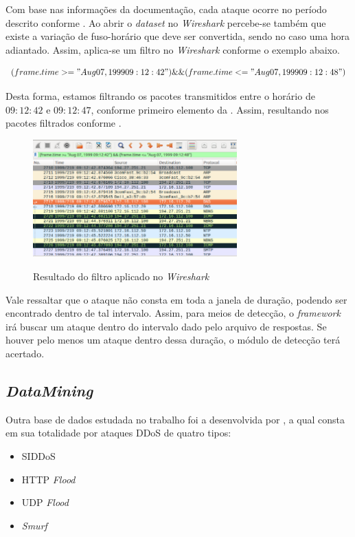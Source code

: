  Com base nas informações da documentação, cada ataque ocorre no período descrito conforme .  Ao abrir o \textit{dataset} no \textit{Wireshark} percebe-se também que existe a variação de fuso-horário que deve ser convertida, sendo no caso uma hora adiantado. Assim, aplica-se um filtro no \textit{Wireshark} conforme o exemplo abaixo.
 
 \begin{equation}
 	(frame.time >= "Aug 07, 1999 09:12:42") \&\& (frame.time <= "Aug 07, 1999 09:12:48")
 \end{equation} 
 
 Desta forma, estamos filtrando os pacotes transmitidos entre o horário de $09:12:42$ e $09:12:47$, conforme primeiro elemento da . Assim, resultando nos pacotes filtrados conforme .

 \begin{figure}[ht]
 	\centering
 	\caption{Resultado do filtro aplicado no \textit{Wireshark} }
 	\includegraphics[width=0.7\textwidth]{figs/filtWireshark1.png}\\
 	\label{fig:wiresharkFilt}
 \end{figure} 
 
Vale ressaltar que o ataque não consta em toda a janela de duração, podendo ser encontrado dentro de tal intervalo. Assim, para meios de detecção, o \textit{framework} irá buscar um ataque dentro do intervalo dado pelo arquivo de respostas. Se houver pelo menos um ataque dentro dessa duração, o módulo de detecção terá acertado.
\subsection{\textit{DataMining}}
Outra base de dados estudada no trabalho foi a desenvolvida por \cite{DataMining}, a qual consta em sua totalidade por ataques DDoS de quatro tipos:
\begin{itemize}
	\item SIDDoS
	\item HTTP \textit{Flood}
	\item UDP \textit{Flood}
	\item \textit{Smurf}
\end{itemize}

